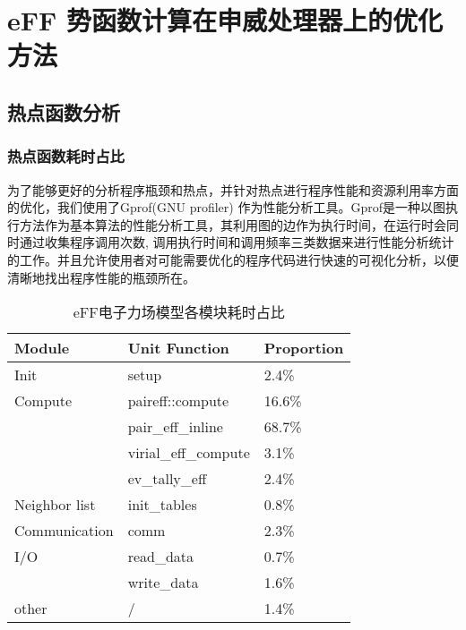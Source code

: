 
\chapter{eFF 势函数计算在申威处理器上的优化方法}

\section{热点函数分析}
\subsection{热点函数耗时占比}
为了能够更好的分析程序瓶颈和热点，并针对热点进行程序性能和资源利用率方面的优化，我们使用了Gprof(GNU profiler)\cite{graham1982gprof} 作为性能分析工具。Gprof是一种以图执行方法作为基本算法的性能分析工具，其利用图的边作为执行时间，在运行时会同时通过收集程序调用次数, 调用执行时间和调用频率三类数据来进行性能分析统计的工作。并且允许使用者对可能需要优化的程序代码进行快速的可视化分析，以便清晰地找出程序性能的瓶颈所在。

\begin{table}[]
  \centering
  \caption{eFF电子力场模型各模块耗时占比}
  \renewcommand{\arraystretch}{1.5}
\begin{tabular}{lll}
\hline
Module        & Unit Function        & Proportion \\ \hline
Init          & setup                & 2.4\%      \\ \hline
Compute       & paireff::compute     & 16.6\%     \\ \cline{2-3} 
              & pair\_eff\_inline    & 68.7\%     \\ \cline{2-3} 
              & virial\_eff\_compute & 3.1\%      \\ \cline{2-3} 
              & ev\_tally\_eff       & 2.4\%      \\ \hline
Neighbor list & init\_tables         & 0.8\%      \\ \hline
Communication & comm                 & 2.3\%      \\ \hline
I/O           & read\_data           & 0.7\%      \\ \cline{2-3} 
              & write\_data          & 1.6\%      \\ \hline
other         & /                    & 1.4\%      \\ \hline
\end{tabular}
\end{table}

